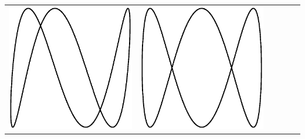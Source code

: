 \begin{center}
\begin{tabular}{c|ccccc}
\includegraphics[scale=0.2]{05_Oscilloscope/3-2.eps} &
\includegraphics[scale=0.2]{05_Oscilloscope/3-3.eps} &

\end{tabular}
\end{center}
